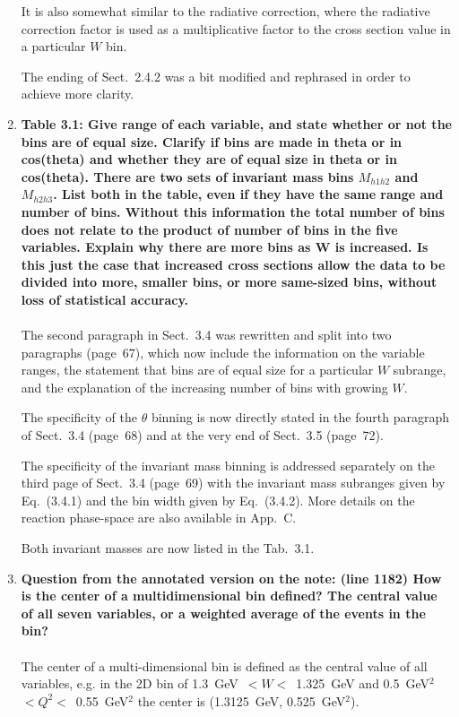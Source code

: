 \documentclass[,superscriptaddress,showpacs,amssymb,amsmath,amsfonts,linenumbers,article]{revtex4-1}
\begin{document}
\begin{enumerate}[label=\textbf{\arabic*}.]
It is also somewhat similar to the radiative correction, where the radiative correction factor is used as a multiplicative factor to the cross section value in a particular $W$ bin. 

The ending of Sect.~2.4.2 was a bit modified and rephrased in order to achieve more clarity.


\item{\bf  Table 3.1: Give range of each variable, and state whether or not the bins are of equal size. Clarify if bins are made in theta or in cos(theta) and whether they are of equal size in theta or in cos(theta). There are two sets of invariant mass bins $M_{h1h2}$ and $M_{h2h3}$. List both in the table, even if they have the same range and number of bins. Without this information the total number of bins does not relate to the product of number of bins in the five variables. Explain why there are more bins as W is increased. Is this just the case that increased cross sections allow the data to be divided into more, smaller bins, or more same-sized bins, without loss of statistical accuracy.}\\ \\
The second paragraph in Sect.~3.4 was rewritten and split into two paragraphs (page~67), which now include the information on the variable ranges, the statement that bins are of equal size for a particular $W$ subrange, and the explanation of the increasing number of bins with growing $W$. 

The specificity of the $\theta$ binning is now directly stated in the fourth paragraph of Sect.~3.4 (page~68) and at the very end of Sect.~3.5 (page~72).

The specificity of the invariant mass binning is addressed separately on the third page of Sect.~3.4 (page~69) with the invariant mass subranges given by Eq.~(3.4.1) and the bin width given by Eq.~(3.4.2). More details on the reaction phase-space are also available in App.~C. 

Both invariant masses are now listed in the Tab.~3.1.

\item {\bf Question from the annotated version on the note: (line 1182) How is the center of a multidimensional bin defined? The central value of all seven variables, or a weighted average of the events in the bin?}\\ \\
The center of a multi-dimensional bin is defined as the central value of all variables, e.g. in the 2D bin of 1.3~GeV~$<W<$~1.325~GeV and 0.5~GeV$^{2}$$<Q^{2}<$~0.55~GeV$^2$ the center is (1.3125~GeV, 0.525~GeV$^2$).




\end{enumerate}
\end{document}
